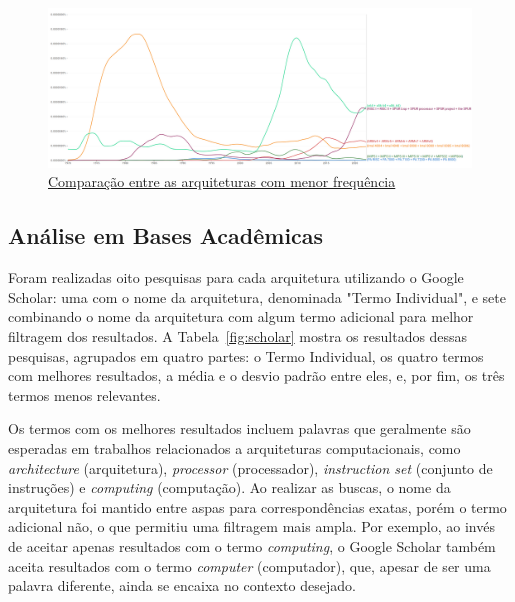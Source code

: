 \documentclass[
	article,			%
	11pt,				%
	oneside,			%
	a4paper,			%
	english,			%
	brazil,				%
	sumario=tradicional
	]{abntex2}
\begin{document}
\begin{figure}
    \centering
    \includegraphics[width=1\linewidth]{Ngrams/Partial.png}
    \caption{\href{https://books.google.com/ngrams/graph?content=PA+RISC\%2BPA+7000\%2BPA+7100\%2BPA+7200\%2BPA+8000\%2BPA+8500,+ARMv4\%2BARMv5\%2BARMv6\%2BARMv7\%2BARMv8,+MIPS+I\%2BMIPS+II\%2BMIPS+III\%2BMIPS+IV\%2BMIPS+V\%2BMIPS32\%2BMIPS64,+Intel+4004\%2BIntel+4040\%2BIntel+8008\%2BIntel+8080\%2BIntel+8085\%2BIntel+8086,+(x64\%2Bx86+64+\%2B+x86_64),+RISC+I\%2BRISC+II\%2BSPUR+Lisp\%2BSPUR+processor\%2BSPUR+project\%2Bthe+SPUR+system\%2BBerkeley+SPUR\%2BBerkeley+RISC\%2BSmalltalk+on+a+RISC\%2BBerkeley+Smalltalk\%2BSOAR+architecture\%2B[RISC-V]\%2BRISC+V&year_start=1970&year_end=2022&corpus=en&smoothing=1}{Comparação entre as arquiteturas com menor frequência}}
    \label{fig:NgramParcial}
\end{figure}

\subsection{Análise em Bases Acadêmicas}

Foram realizadas oito pesquisas para cada arquitetura utilizando o Google Scholar: uma com o nome da arquitetura, denominada "Termo Individual", e sete combinando o nome da arquitetura com algum termo adicional para melhor filtragem dos resultados. A Tabela~\ref{fig:scholar} mostra os resultados dessas pesquisas, agrupados em quatro partes: o Termo Individual, os quatro termos com melhores resultados, a média e o desvio padrão entre eles, e, por fim, os três termos menos relevantes.

Os termos com os melhores resultados incluem palavras que geralmente são esperadas em trabalhos relacionados a arquiteturas computacionais, como \textit{architecture} (arquitetura), \textit{processor} (processador), \textit{instruction set} (conjunto de instruções) e \textit{computing} (computação). Ao realizar as buscas, o nome da arquitetura foi mantido entre aspas para correspondências exatas, porém o termo adicional não, o que permitiu uma filtragem mais ampla. Por exemplo, ao invés de aceitar apenas resultados com o termo \textit{computing}, o Google Scholar também aceita resultados com o termo \textit{computer} (computador), que, apesar de ser uma palavra diferente, ainda se encaixa no contexto desejado.
\end{document}
